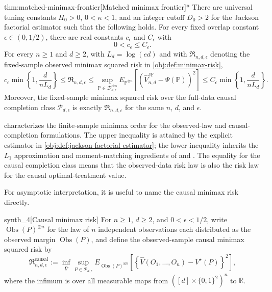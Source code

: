 \documentclass[11pt]{article}
\begin{document}
\begin{theoremv}{thm:matched-minimax-frontier}[Matched minimax frontier]*
There are universal tuning constants \(H_0>0\), \(0<\kappa<1\), and an integer cutoff \(D_0>2\) for the Jackson factorial estimator such that the following holds.  For every fixed overlap constant \(\epsilon\in(0,1/2)\), there are real constants \(c_\epsilon\) and \(C_\epsilon\) with
\[
0<c_\epsilon\leq C_\epsilon .
\]
For every \(n\geq 1\) and \(d\geq 2\), with \(L_d=\log(ed)\) and with \(\mathfrak R_{n,d,\epsilon}\) denoting the fixed-sample observed minimax squared risk in \cref{obj:def:minimax-risk},
\[
c_\epsilon \min\left\{1,\frac{d}{nL_d}\right\}
\leq
\mathfrak R_{n,d,\epsilon}
\leq
\sup_{\mathbb P\in\mathcal D_{d,\epsilon}^{\mathrm{obs}}}
E_{\mathbb P^{\otimes n}}\!\left[
  \left(\widehat V_{n,d}^{\mathrm{JF}}-\Psi(\mathbb P)\right)^2
\right]
\leq
C_\epsilon \min\left\{1,\frac{d}{nL_d}\right\}.
\]
Moreover, the fixed-sample minimax squared risk over the full-data causal completion class \(\mathcal P_{d,\epsilon}\) is exactly \(\mathfrak R_{n,d,\epsilon}\) for the same \(n\), \(d\), and \(\epsilon\).
\end{theoremv}

 characterizes the finite-sample minimax order for the observed-law and causal-completion formulations. The upper inequality is attained by the explicit estimator in \cref{obj:def:jackson-factorial-estimator}; the lower inequality inherits the \(L_1\) approximation and moment-matching ingredients of \citet{CaiLow2011L1} and \citet{JiaoHanWeissman2018L1}. The equality for the causal completion class means that the observed-data risk law is also the risk law for the causal optimal-treatment value.

For asymptotic interpretation, it is useful to name the causal minimax risk directly.

\begin{definitionv}{synth_4}[Causal minimax risk]
For \(n\ge1\), \(d\ge2\), and \(0<\epsilon<1/2\), write \(\operatorname{Obs}(P)^{\otimes n}\) for the law of \(n\) independent observations each distributed as the observed margin \(\operatorname{Obs}(P)\), and define the observed-sample causal minimax squared risk by \[ \mathfrak R^{\mathrm{causal}}_{n,d,\epsilon}:=\inf_{\widehat V}\sup_{P\in\mathcal P_{d,\epsilon}} E_{\operatorname{Obs}(P)^{\otimes n}}\left[\left\{\widehat V(O_1,\ldots,O_n)-V^\star(P)\right\}^2\right], \] where the infimum is over all measurable maps from \(([d]\times\{0,1\}^2)^n\) to \(\mathbb R\).
\end{definitionv}
\end{document}
